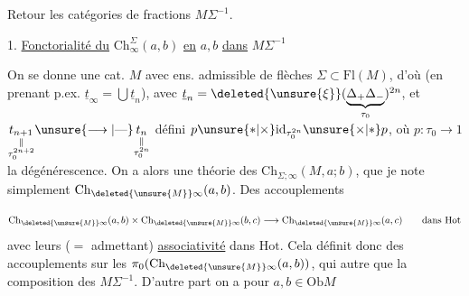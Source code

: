  Retour  les catégories de fractions $M\Sigma^{-1}$.

1. \uline{Fonctorialité du} $\mathrm{Ch}^{\Sigma}_{\infty}(a,b)$ \uline{en} $a,b$ \uline{dans} $M\Sigma^{-1}$

On se donne une cat. $M$ avec ens. admissible de flèches $\Sigma\subset\mathrm{Fl}(M)$, d'où (en prenant p.ex. $\underline t_{\infty}=\bigcup\underline t_n$), avec $\underline t_n=\deleted{\unsure{\xi}}(\underbrace{\Delta_+\Delta_-}_{\tau_0})^{2n}$, et $\underset{\substack{\Vert\\\tau_0^{2n+2}}}{t_{n+1}}\unsure{\longrightarrow|\text{---}}\underset{\substack{\Vert\\\tau_0^{2n}}}{t_n}$ défini   $p\unsure{*|\times}\mathrm{id}_{\tau_0^{2n}}\unsure{\times|*}p$, où $p:\tau_0\to1$ la dégénérescence. On a alors une théorie des $\mathrm{Ch}_{\Sigma;\infty}(M,a;b)$, que je note simplement $\mathrm{Ch}_{\deleted{\unsure{M}}\infty}(a,b)$. Des  accouplements

\[
\mathrm{Ch}_{\deleted{\unsure{M}}\infty}(a,b)\times\mathrm{Ch}_{\deleted{\unsure{M}}\infty}(b,c)\longrightarrow\mathrm{Ch}_{\deleted{\unsure{M}}\infty}(a,c)\qquad\text{dans }\mathrm{Hot}
\]
avec leurs  ($=$ admettant) \uline{associativité}  dans $\mathrm{Hot}$.  Cela définit donc des accouplements sur les $\pi_0(\mathrm{Ch}_{\deleted{\unsure{M}}\infty}(a,b))$, qui  autre que la composition des   $M\Sigma^{-1}$. D'autre part on a pour $a,b\in\mathrm{Ob}M$

